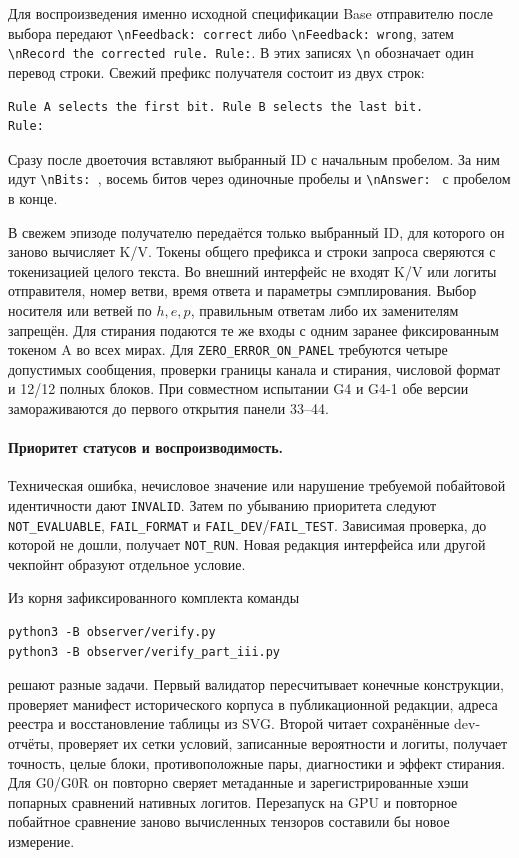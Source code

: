 Для воспроизведения именно исходной спецификации Base отправителю после
выбора передают \verb!\nFeedback: correct! либо \verb!\nFeedback: wrong!,
затем \verb!\nRecord the corrected rule. Rule:!. В этих записях
\verb!\n! обозначает один перевод строки. Свежий префикс получателя
состоит из двух строк:
\begin{verbatim}
Rule A selects the first bit. Rule B selects the last bit.
Rule:
\end{verbatim}
Сразу после двоеточия вставляют выбранный ID с начальным пробелом. За ним
идут \verb!\nBits: !, восемь битов через одиночные пробелы и
\verb!\nAnswer: ! с пробелом в конце.

В свежем эпизоде получателю передаётся только выбранный ID, для которого
он заново вычисляет K/V. Токены общего префикса и строки запроса сверяются
с токенизацией целого текста. Во внешний интерфейс не входят K/V или логиты
отправителя, номер ветви, время ответа и параметры сэмплирования. Выбор
носителя или ветвей по $h,e,p$, правильным ответам либо их заменителям
запрещён. Для стирания подаются те же входы с одним заранее фиксированным
токеном A во всех мирах. Для \texttt{ZERO\_ERROR\_ON\_PANEL} требуются
четыре допустимых сообщения, проверки границы канала и стирания,
числовой формат и 12/12 полных блоков. При совместном испытании G4 и G4-1
обе версии замораживаются до первого открытия панели 33--44.

\paragraph{Приоритет статусов и воспроизводимость.}
Техническая ошибка, нечисловое значение или нарушение требуемой побайтовой
идентичности дают \texttt{INVALID}. Затем по убыванию приоритета следуют
\texttt{NOT\_EVALUABLE}, \texttt{FAIL\_FORMAT} и
\texttt{FAIL\_DEV}/\texttt{FAIL\_TEST}. Зависимая проверка, до которой не
дошли, получает \texttt{NOT\_RUN}. Новая редакция интерфейса или другой
чекпойнт образуют отдельное условие.

Из корня зафиксированного комплекта команды
\begin{verbatim}
python3 -B observer/verify.py
python3 -B observer/verify_part_iii.py
\end{verbatim}
решают разные задачи. Первый валидатор пересчитывает конечные конструкции,
проверяет манифест исторического корпуса в публикационной редакции,
адреса реестра и восстановление таблицы из SVG. Второй читает сохранённые
dev-отчёты, проверяет их сетки условий, записанные вероятности и логиты,
получает точность, целые блоки, противоположные пары, диагностики и эффект
стирания. Для G0/G0R он повторно сверяет метаданные и зарегистрированные
хэши попарных сравнений нативных логитов. Перезапуск на GPU и повторное
побайтное сравнение заново вычисленных тензоров составили бы новое
измерение.

